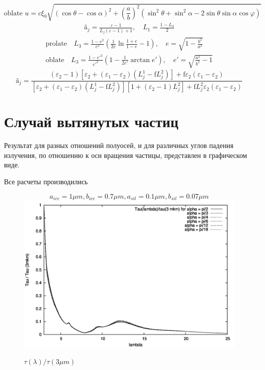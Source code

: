 \documentclass[a4paper,10pt]{article}
\begin{document}
\begin{equation}
  \text{oblate    } u=c\xi_0\sqrt{(\cos\theta-\cos\alpha)^2+\left(\frac{a}{b}\right)^{2}(\sin^2\theta+\sin^2\alpha-2\sin\theta\sin\alpha\cos\varphi)} 
\end{equation}
\begin{eqnarray}
 \text{\~{a}}_j = \frac{\varepsilon-1}{L_j(\varepsilon-1)+1},\quad L_1=\frac{1-L_3}{2}
\end{eqnarray}
\begin{eqnarray}
  \text{prolate}\quad L_3 = \frac{1-e^2}{e^2}\left(\frac{1}{2e}\ln\frac{1+e}{1-e}-1\right),\quad e=\sqrt{1-\frac{b^2}{a^2}}\\
  \text{oblate}\quad L_3 = \frac{1-e'^2}{e'^2}\left(1 - \frac{1}{2e'}\arctan{e'}\right),\quad e'=\sqrt{\frac{a^2}{b^2}-1}
\end{eqnarray}
\begin{equation}
 \text{\~{a}}_j = \frac{(\varepsilon_2-1)[\varepsilon_2+(\varepsilon_1-\varepsilon_2)(L^{1}_{j} - \text{\~{f}}L^2_j)]
	    +\text{\~{f}}\varepsilon_2(\varepsilon_1-\varepsilon_2)}
	    {[\varepsilon_2+(\varepsilon_1-\varepsilon_2)(L^{1}_{j} - \text{\~{f}}L^2_j)][1+(\varepsilon_2-1)L^2_j]+
	    \text{\~{f}}L^2_j\varepsilon_2(\varepsilon_1-\varepsilon_2)} 
\end{equation}
\section{Случай вытянутых частиц}
\par
Результат для разных отношений полуосей, и для различных углов падения излучения,
по отношению к оси вращения частицы, представлен в графическом виде.
\par
Все расчеты производились
\begin{figure}[p]
$$a_{ice} = 1 \mu m,b_{ice} = 0.7 \mu m , a_{sil} = 0.1 \mu m , b_{sil} = 0.07  \mu m $$
 \includegraphics{../plots/tau-1-07.jpg}
 \caption{$\tau(\lambda)/\tau(3\mu m)$ }
\end{figure}
\end{document}
